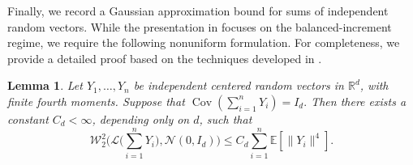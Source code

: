 \documentclass[11pt,letterpaper]{article}
\theoremstyle{plain}
\newtheorem{lemma}{Lemma}
\theoremstyle{definition}
\theoremstyle{remark}
\newcommand{\law}{\mathcal{L}}
\begin{document}
Finally, we record a Gaussian approximation bound for sums of independent
random vectors. While the presentation in \cite{bonis2020stein} focuses on
the balanced-increment regime, we require the following nonuniform
formulation. For completeness, we provide a detailed proof based on the
techniques developed in \cite{bonis2020stein}.
\begin{lemma}\label{lem:GA-independent}
Let \(Y_1,\dots,Y_n\) be independent centered random vectors in
\(\mathbb R^d\), with finite fourth moments. Suppose that $\operatorname{Cov}\left(\sum_{i=1}^n Y_i\right)=I_d .$ Then there exists a constant \(C_d<\infty\), depending only on \(d\), such that
\[
\mathcal W_2^2
\Big(
    \law\big(\sum_{i=1}^n Y_i\big),
    \mathcal N(0,I_d)
\Big)
\le
C_d
\sum_{i=1}^n
\mathbb E\left[\|Y_i\|^4\right] .
\]
\end{lemma}
\end{document}
